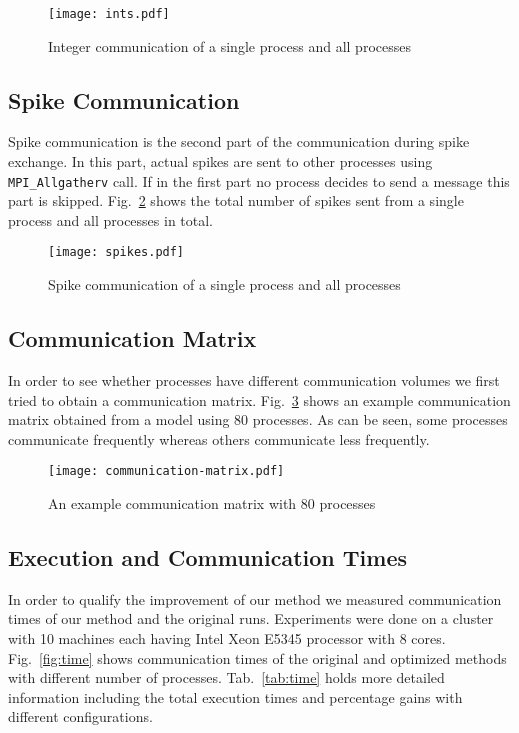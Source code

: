 \documentclass{article}
\begin{document}
\begin{figure}
  \centering
  \texttt{[image: ints.pdf]}
  \caption{Integer communication of a single process and all processes}
  \label{fig:ints}
\end{figure}

\subsection{Spike Communication}

Spike communication is the second part of the communication during spike exchange.
In this part, actual spikes are sent to other processes using \texttt{MPI\_Allgatherv} call.
If in the first part no process decides to send a message this part is skipped.
Fig.~\ref{fig:labels} shows the total number of spikes sent from a single process and all processes in total.

\begin{figure}
  \centering
  \texttt{[image: spikes.pdf]}
  \caption{Spike communication of a single process and all processes}
  \label{fig:labels}
\end{figure}

\subsection{Communication Matrix}

In order to see whether processes have different communication volumes we first tried to obtain a communication matrix.
Fig.~\ref{fig:comm} shows an example communication matrix obtained from a model using 80 processes.
As can be seen, some processes communicate frequently whereas others communicate less frequently.

\begin{figure}
  \centering
  \texttt{[image: communication-matrix.pdf]}
  \caption{An example communication matrix with 80 processes}
  \label{fig:comm}
\end{figure}

\subsection{Execution and Communication Times}

In order to qualify the improvement of our method we measured communication times of our method and the original runs.
Experiments were done on a cluster with 10 machines each having Intel Xeon E5345 processor with 8 cores.
Fig.~\ref{fig:time} shows communication times of the original and optimized methods with different number of processes.
Tab.~\ref{tab:time} holds more detailed information including the total execution times and percentage gains with different configurations.
\end{document}
